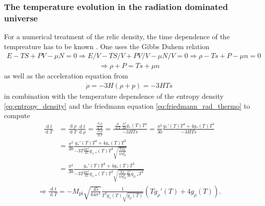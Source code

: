 \documentclass[a4paper]{article}
\DeclareMathOperator*{\diff}{d}
\begin{document}
\subsubsection{The temperature evolution in the radiation dominated universe}
For a numerical treatment of the relic density, the time dependence of
the tempreature has to be known \cite[Sec. S11]{LatticQCD4Cosmo}.
One uses the Gibbs Duhem relation 
\begin{align*}
    E - TS + PV - \mu N = 0 \Rightarrow E / V - T S / V + P V / V - \mu N / V = 0
    \Rightarrow \rho - T s + P - \mu n = 0
\end{align*}
\begin{align}
    \label{eq:gibbs_duhem}
    \Rightarrow \rho + P = T s + \mu n
\end{align}
as well as the acceleration equation from \cite[Chap. 1.3.3, Page 23]{CosmologyBookMukhanov}
\begin{align}
    \label{eq:accel_eq}
    \dot{\rho} = -3H(\rho + p) = -3H T s
\end{align}
in combination with the temperature dependence of the entropy density
\ref{eq:entropy_density}
and the friedmann equation \ref{eq:friedmann_rad_thermo}
to compute
\begin{align*}
    \frac{\diff  t}{\diff  T} 
    &= \frac{\diff  \rho}{\diff  T} \frac{\diff  t}{\diff  \rho} 
    = \frac{\frac{\diff  \rho}{\diff  T}} {\frac{\diff  \rho}{\diff  t}} 
    = \frac{\frac{\diff }{\diff T} \frac{\pi^2}{30}g_*(T) T^4}{-3HTs} 
    = \frac{\pi^2}{30} \frac{g_*'(T)T^4 + 4 g_*(T) T^3 }{-3HTs} \\
    &= \frac{\pi^2}{30} \frac{g_*'(T)T^4 + 4 g_*(T) T^3 }{-3T \frac{2 \pi^2}{45} g_{s, *}(T) T^3 \sqrt{\frac{8 \pi \rho}{3 M_\mathrm{pl}^2}}} \\
    &= \frac{\pi^2}{30} \frac{g_*'(T)T^4 + 4 g_*(T) T^3 }{-3T \frac{2 \pi^2}{45} g_{s, *}(T) T^3 \sqrt{\frac{8 \pi}{3 M_\mathrm{pl}^2} \frac{\pi^2}{30} g_{\rho, *} T^4}} 
\end{align*}
\begin{align}
    \label{eq:dtdT}
    \Rightarrow \frac{\diff t}{\diff T} = - M_\mathrm{pl} \sqrt{\frac{45}{64 \pi^3}} \frac{1}{T^3 g_s(T) \sqrt{g_\rho(T)}} (T g_\rho'(T) + 4 g_\rho(T)).
\end{align}
\end{document}

